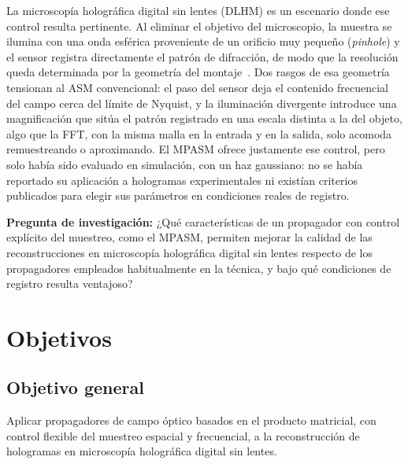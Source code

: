 La microscopía holográfica digital sin lentes (DLHM) es un escenario donde ese
control resulta pertinente. Al eliminar el objetivo del microscopio, la muestra
se ilumina con una onda esférica proveniente de un orificio muy pequeño
(\emph{pinhole}) y el sensor registra directamente el patrón de difracción, de
modo que la resolución queda determinada por la geometría del
montaje~\cite{lopera2024}. Dos rasgos de esa geometría tensionan al ASM
convencional: el paso del sensor deja el contenido frecuencial del campo cerca
del límite de Nyquist, y la iluminación divergente introduce una magnificación
que sitúa el patrón registrado en una escala distinta a la del objeto, algo que
la FFT, con la misma malla en la entrada y en la salida, solo acomoda
remuestreando o aproximando. El MPASM ofrece justamente ese control, pero solo
había sido evaluado en simulación, con un haz gaussiano: no se había reportado
su aplicación a hologramas experimentales ni
existían criterios publicados para elegir sus parámetros en condiciones reales
de registro.

\vspace{0.2cm}
\noindent\textbf{Pregunta de investigación:} ¿Qué características de un
propagador con control explícito del muestreo, como el MPASM, permiten mejorar
la calidad de las reconstrucciones en microscopía holográfica digital sin lentes
respecto de los propagadores empleados habitualmente en la técnica, y bajo qué
condiciones de registro resulta ventajoso?

\section{Objetivos}
\label{sec:objetivos}

\subsection*{Objetivo general}

Aplicar propagadores de campo óptico basados en el producto matricial, con
control flexible del muestreo espacial y frecuencial, a la reconstrucción de
hologramas en microscopía holográfica digital sin lentes.

